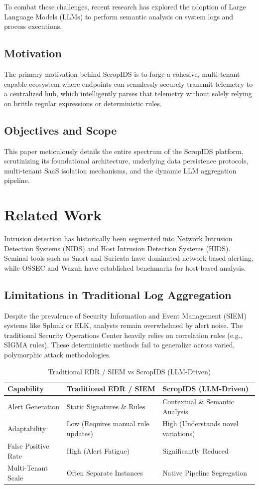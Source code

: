 \documentclass[10pt, conference]{IEEEtran}
\begin{document}
To combat these challenges, recent research has explored the adoption of Large Language Models (LLMs) to perform semantic analysis on system logs and process executions. 

\subsection{Motivation}
The primary motivation behind ScropIDS is to forge a cohesive, multi-tenant capable ecosystem where endpoints can seamlessly securely transmit telemetry to a centralized hub, which intelligently parses that telemetry without solely relying on brittle regular expressions or deterministic rules.

\subsection{Objectives and Scope}
This paper meticulously details the entire spectrum of the ScropIDS platform, scrutinizing its foundational architecture, underlying data persistence protocols, multi-tenant SaaS isolation mechanisms, and the dynamic LLM aggregation pipeline.

\section{Related Work}
Intrusion detection has historically been segmented into Network Intrusion Detection Systems (NIDS) and Host Intrusion Detection Systems (HIDS). Seminal tools such as Snort and Suricata have dominated network-based alerting, while OSSEC and Wazuh have established benchmarks for host-based analysis.

\subsection{Limitations in Traditional Log Aggregation}
Despite the prevalence of Security Information and Event Management (SIEM) systems like Splunk or ELK, analysts remain overwhelmed by alert noise. The traditional Security Operations Center heavily relies on correlation rules (e.g., SIGMA rules). These deterministic methods fail to generalize across varied, polymorphic attack methodologies.

\begin{table}[h]
\centering
\caption{Traditional EDR / SIEM vs ScropIDS (LLM-Driven)}
\begin{tabularx}{\linewidth}{|X|X|X|}
\hline
\textbf{Capability} & \textbf{Traditional EDR / SIEM} & \textbf{ScropIDS (LLM-Driven)} \\ \hline
Alert Generation & Static Signatures \& Rules & Contextual \& Semantic Analysis \\ \hline
Adaptability & Low (Requires manual rule updates) & High (Understands novel variations) \\ \hline
False Positive Rate & High (Alert Fatigue) & Significantly Reduced \\ \hline
Multi-Tenant Scale & Often Separate Instances & Native Pipeline Segregation \\ \hline
\end{tabularx}
\end{table}
\end{document}
